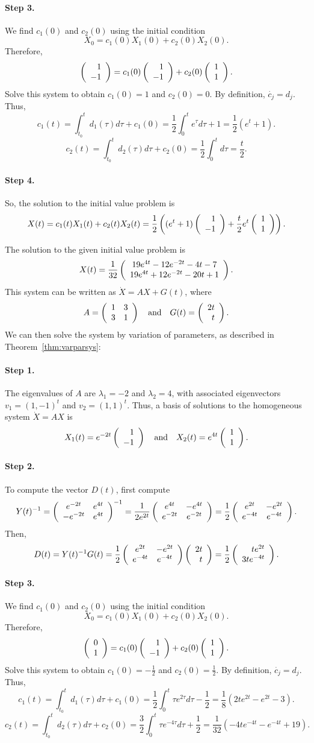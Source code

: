 \paragraph{Step 3.} We find $c_1(0)$ and $c_2(0)$ using the initial
condition
\[
X_0 = c_1(0)X_1(0) + c_2(0)X_2(0).
\]
Therefore,
\[
\left(\begin{array}{r} 1 \\ -1\end{array}\right) = c_1(0)\left(\begin{array}{r} 1 \\ -1\end{array}\right) + c_2(0)\left(\begin{array}{r} 1 \\ 1\end{array}\right).
\]
Solve this system to obtain $c_1(0) = 1$ and $c_2(0) = 0$.  By definition,
$\dot{c_j} = d_j$.  Thus,
\[
c_1(t) = \int_{t_0}^td_1(\tau)d\tau + c_1(0)
= \frac{1}{2}\int_0^te^\tau d\tau + 1 = \frac{1}{2}(e^t + 1).
\]
\[
c_2(t) = \int_{t_0}^td_2(\tau)d\tau + c_2(0)
= \frac{1}{2}\int_0^td\tau = \frac{t}{2}.
\]
\paragraph{Step 4.} So, the solution to the initial value problem is
\[
X(t) = c_1(t)X_1(t) + c_2(t)X_2(t)
= \frac{1}{2}\left((e^t + 1)\left(\begin{array}{r} 1 \\ -1\end{array}\right) + \frac{t}{2}e^t\left(\begin{array}{r} 1 \\ 1\end{array}\right)
\right).
\]

 \ans The solution to the given initial value problem is
\[
X(t) = \frac{1}{32}\left(\begin{array}{c} 19e^{4t} - 12e^{-2t} - 4t - 7 \\ 19e^{4t} + 12e^{-2t} - 20t + 1\end{array}\right).
\]
\soln This system can be written as $\dot{X} = AX + G(t)$, where
\[
A = \left(\begin{array}{rr} 1 & 3\\ 3 &1\end{array}\right) \quad\mbox{and}\quad G(t) = \left(\begin{array}{r} 2t \\ t\end{array}\right).
\]
We can then solve the system by variation of parameters, as described in
Theorem~\ref{thm:varparsys}:

\paragraph{Step 1.} The eigenvalues of $A$ are $\lambda_1 = -2$ and
$\lambda_2 = 4$, with associated eigenvectors $v_1 = (1,-1)^t$ and
$v_2 = (1,1)^t$.  Thus, a basis of solutions to the homogeneous system
$\dot{X} = AX$ is
\[
X_1(t) = e^{-2t}\left(\begin{array}{r} 1 \\ -1\end{array}\right) \quad\mbox{and}\quad X_2(t) = e^{4t}\left(\begin{array}{r} 1 \\ 1\end{array}\right).
\]
\paragraph{Step 2.} To compute the vector $D(t)$, first compute
\[
Y(t)^{-1} = \left(\begin{array}{cc} e^{-2t} & e^{4t}\\ -e^{-2t} &e^{4t}\end{array}\right)^{-1}
= \frac{1}{2e^{2t}}\left(\begin{array}{cc} e^{4t} & -e^{4t}\\ e^{-2t} &e^{-2t}\end{array}\right)
= \frac{1}{2}\left(\begin{array}{cc} e^{2t} & -e^{2t}\\ e^{-4t} &e^{-4t}\end{array}\right).
\]
Then,
\[
D(t) = Y(t)^{-1}G(t) =
\frac{1}{2}\left(\begin{array}{cc} e^{2t} & -e^{2t}\\ e^{-4t} &e^{-4t}\end{array}\right)\left(\begin{array}{r} 2t \\ t\end{array}\right) =
\frac{1}{2}\left(\begin{array}{r} te^{2t} \\ 3te^{-4t}\end{array}\right).
\]
\paragraph{Step 3.} We find $c_1(0)$ and $c_2(0)$ using the initial
condition
\[
X_0 = c_1(0)X_1(0) + c_2(0)X_2(0).
\]
Therefore,
\[
\left(\begin{array}{r} 0 \\ 1\end{array}\right) = c_1(0)\left(\begin{array}{r} 1 \\ -1\end{array}\right) + c_2(0)\left(\begin{array}{r} 1 \\ 1\end{array}\right).
\]
Solve this system to obtain $c_1(0) = -\frac{1}{2}$ and $c_2(0) =
\frac{1}{2}$.  By definition, $\dot{c_j} = d_j$.  Thus,
\[
c_1(t) = \int_{t_0}^td_1(\tau)d\tau + c_1(0)
= \frac{1}{2}\int_0^t \tau e^{2\tau}d\tau - \frac{1}{2}
= \frac{1}{8}(2te^{2t} - e^{2t} - 3).
\]
\[
c_2(t) = \int_{t_0}^td_2(\tau)d\tau + c_2(0)
= \frac{3}{2}\int_0^t \tau e^{-4\tau}d\tau + \frac{1}{2}
= \frac{1}{32}(-4te^{-4t} - e^{-4t} + 19).
\]
\newpage
